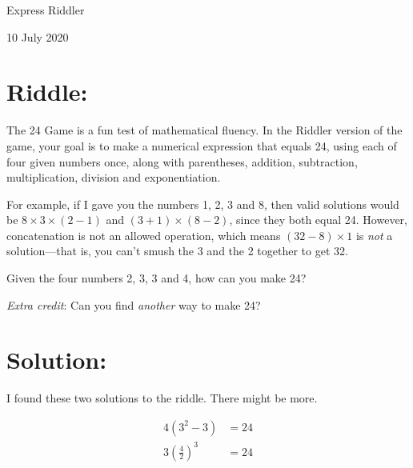 \documentclass{article}
\begin{document}
\pagestyle{empty} %

\begin{center}
{\LARGE Express Riddler}

\vspace{0.15in}

{\Large 10 July 2020}
\end{center}


\section*{Riddle:}

The 24 Game is a fun test of mathematical fluency.
In the Riddler version of the game, your goal is to make a numerical expression that equals 24, using each of four given numbers once, along with parentheses, addition, subtraction, multiplication, division and exponentiation.

For example, if I gave you the numbers 1, 2, 3 and 8, then valid solutions would be $8\times3\times(2-1)$ and $(3+1)\times(8-2)$, since they both equal 24.
However, concatenation is not an allowed operation, which means $(32-8)\times1$ is \textit{not} a solution---that is, you can’t smush the 3 and the 2 together to get 32.

Given the four numbers 2, 3, 3 and 4, how can you make 24?

\textit{Extra credit}: Can you find \textit{another} way to make 24?

\section*{Solution:}

I found these two solutions to the riddle.
There might be more.

\begin{align*}
4\left(3^{2}-3\right) &= 24 \\
3\left(\frac{4}{2}\right)^{3} &= 24
\end{align*}
\end{document}
